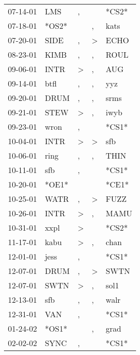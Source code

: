 \begin{supertabular}{lllll}
 07-14-01 &    LMS &                , &                  &  *CS2* \\
 07-18-01 &  *OS2* &                  &                , &   kats \\
 07-20-01 &   SIDE &                , &     \textgreater &   ECHO \\
 08-23-01 &   KIMB &                , &                , &   ROUL \\
 09-06-01 &   INTR &     \textgreater &                , &    AUG \\
 09-14-01 &   btfl &                , &                , &    yyz \\
 09-20-01 &   DRUM &                , &                , &   srms \\
 09-21-01 &   STEW &     \textgreater &                , &   iwyb \\
 09-23-01 &   wron &                , &                  &  *CS1* \\
 10-04-01 &   INTR &     \textgreater &     \textgreater &    sfb \\
 10-06-01 &   ring &                , &                , &   THIN \\
 10-11-01 &    sfb &                , &                  &  *CS1* \\
 10-20-01 &  *OE1* &                  &                  &  *CE1* \\
 10-25-01 &   WATR &                , &     \textgreater &   FUZZ \\
 10-26-01 &   INTR &     \textgreater &                , &   MAMU \\
 10-31-01 &   xxpl &     \textgreater &                  &  *CS2* \\
 11-17-01 &   kabu &     \textgreater &                , &   chan \\
 12-01-01 &   jess &                , &                  &  *CS1* \\
 12-07-01 &   DRUM &                , &     \textgreater &   SWTN \\
 12-07-01 &   SWTN &     \textgreater &                , &   sol1 \\
 12-13-01 &    sfb &                , &                , &   walr \\
 12-31-01 &    VAN &                , &                  &  *CS1* \\
 01-24-02 &  *OS1* &                  &                , &   grad \\
 02-02-02 &   SYNC &                , &                  &  *CS1* \\

\end{supertabular}
